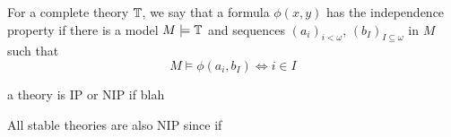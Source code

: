 \documentclass[../main.tex]{subfiles}
\begin{document}
\begin{defn}
  For a complete theory $\mathbb{T}$, we say that a formula $\phi(x,y)$ has the independence property
  if there is a model $M \models \mathbb{T}$ and sequences $(a_i)_{i<\omega}$,
  $(b_I)_{I \subseteq \omega}$ in $M$ such that
  \begin{equation*}
    M \models \phi(a_i,b_I) \iff i \in I
  \end{equation*}
\end{defn}

\begin{defn}
  a theory is IP or NIP if blah
\end{defn}

\begin{exmp}
  All stable theories are also NIP since if 
\end{exmp}
\end{document}
